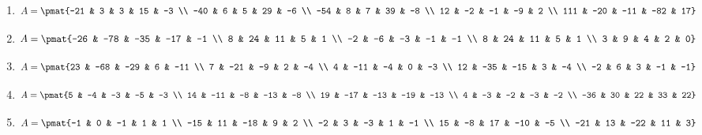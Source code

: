 \begin{enumerate}
\item

\begin{align*}
A = \pmat{-21 & 3 & 3 & 15 & -3 \\ -40 & 6 & 5 & 29 & -6 \\ -54 & 8 & 7 & 39 & -8 \\ 12 & -2 & -1 & -9 & 2 \\ 111 & -20 & -11 & -82 & 17}
\end{align*}

\item

\begin{align*}
A = \pmat{-26 & -78 & -35 & -17 & -1 \\ 8 & 24 & 11 & 5 & 1 \\ -2 & -6 & -3 & -1 & -1 \\ 8 & 24 & 11 & 5 & 1 \\ 3 & 9 & 4 & 2 & 0}
\end{align*}

\item

\begin{align*}
A = \pmat{23 & -68 & -29 & 6 & -11 \\ 7 & -21 & -9 & 2 & -4 \\ 4 & -11 & -4 & 0 & -3 \\ 12 & -35 & -15 & 3 & -4 \\ -2 & 6 & 3 & -1 & -1}
\end{align*}

\item

\begin{align*}
A = \pmat{5 & -4 & -3 & -5 & -3 \\ 14 & -11 & -8 & -13 & -8 \\ 19 & -17 & -13 & -19 & -13 \\ 4 & -3 & -2 & -3 & -2 \\ -36 & 30 & 22 & 33 & 22}
\end{align*}

\item

\begin{align*}
A = \pmat{-1 & 0 & -1 & 1 & 1 \\ -15 & 11 & -18 & 9 & 2 \\ -2 & 3 & -3 & 1 & -1 \\ 15 & -8 & 17 & -10 & -5 \\ -21 & 13 & -22 & 11 & 3}
\end{align*}


\end{enumerate}
